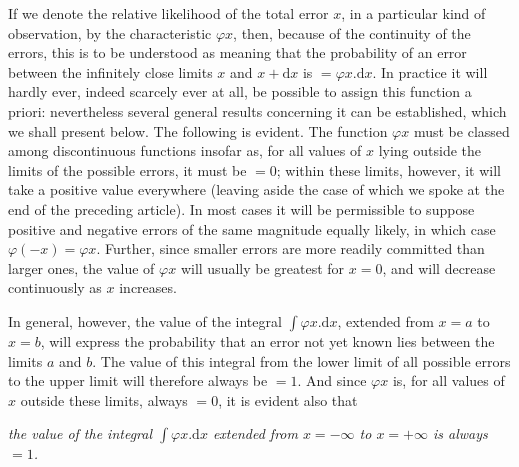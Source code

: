 If we denote the relative likelihood of the total error \(x\), in a particular kind of observation, by the characteristic \(\varphi x\), then, because of the continuity of the errors, this is to be understood as meaning that the probability of an error between the infinitely close limits \(x\) and \(x+\mathrm{d}x\) is \(=\varphi x.\mathrm{d}x\). In practice it will hardly ever, indeed scarcely ever at all, be possible to assign this function a priori: nevertheless several general results concerning it can be established, which we shall present below. The following is evident. The function \(\varphi x\) must be classed among discontinuous functions insofar as, for all values of \(x\) lying outside the limits of the possible errors, it must be \(=0\); within these limits, however, it will take a positive value everywhere (leaving aside the case of which we spoke at the end of the preceding article). In most cases it will be permissible to suppose positive and negative errors of the same magnitude equally likely, in which case \(\varphi(-x)=\varphi x\). Further, since smaller errors are more readily committed than larger ones, the value of \(\varphi x\) will usually be greatest for \(x=0\), and will decrease continuously as \(x\) increases.

In general, however, the value of the integral \(\int\varphi x.\mathrm{d}x\), extended from \(x=a\) to \(x=b\), will express the probability that an error not yet known lies between the limits \(a\) and \(b\). The value of this integral from the lower limit of all possible errors to the upper limit will therefore always be \(=1\). And since \(\varphi x\)
is, for all values of \(x\) outside these limits, always \(=0\), it is evident also that

\textit{the value of the integral \(\int\varphi x.\mathrm{d}x\) extended from \(x=-\infty\) to \(x=+\infty\) is always \(=1\).}

